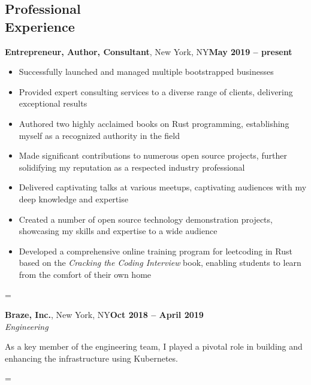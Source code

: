 \documentclass[margin,line]{resume}
\newenvironment{absolutelynopagebreak}
{\par\nobreak\vfil\penalty0\vfilneg
\vtop\bgroup}
{\par\xdef\tpd{\the\prevdepth}\egroup
\prevdepth=\tpd}
\begin{document}
\begin{resume}
\begin{absolutelynopagebreak}
\section{\mysidestyle Professional\\Experience}

\textbf{Entrepreneur, Author, Consultant}, New York, NY\hfill \textbf{May 2019 -- present}\vspace{2mm}\\\vspace{1mm}%
\begin{itemize}
\item Successfully launched and managed multiple bootstrapped businesses
\item Provided expert consulting services to a diverse range of clients, delivering exceptional results
\item Authored two highly acclaimed books on Rust programming, establishing myself as a recognized authority in the field
\item Made significant contributions to numerous open source projects, further solidifying my reputation as a respected industry professional
\item Delivered captivating talks at various meetups, captivating audiences with my deep knowledge and expertise
\item Created a number of open source technology demonstration projects, showcasing my skills and expertise to a wide audience
\item Developed a comprehensive online training program for leetcoding in Rust based on the \emph{Cracking the Coding Interview} book, enabling students to learn from the comfort of their own home
\end{itemize}
\end{absolutelynopagebreak}

\vspace{5mm}

\begin{absolutelynopagebreak}
\textbf{Braze, Inc.}, New York, NY\hfill \textbf{Oct 2018 -- April 2019}\vspace{2mm}\\\vspace{1mm}%
\textsl{Engineering}

As a key member of the engineering team, I played a pivotal role in building and enhancing the infrastructure using Kubernetes.


\end{absolutelynopagebreak}
\end{resume}
\end{document}
